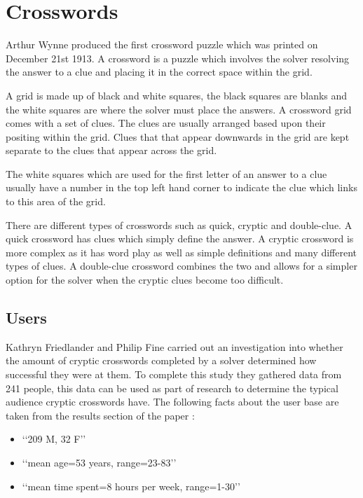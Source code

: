 \section{Crosswords}

Arthur Wynne produced the first crossword puzzle which was printed on December
21st 1913. A crossword is a puzzle which involves the solver resolving the
answer to a clue and placing it in the correct space within the grid. 

A grid is made up of black and white squares, the black squares are blanks and 
the white squares are where the solver must place the answers. A crossword grid 
comes with a set of clues. The clues are usually arranged based upon their 
positing within the grid. Clues that that appear downwards in the grid are kept 
separate to the clues that appear across the grid. 

The white squares which are used for the first letter of an answer to a clue 
usually have a number in the top left hand corner to indicate the clue which 
links to this area of the grid.

There are different types of crosswords such as quick, cryptic and double-clue.
A quick crossword has clues which simply define the answer. A cryptic crossword
is more complex as it has word play as well as simple definitions and many
different types of clues. A double-clue crossword combines the two and allows
for a simpler option for the solver when the cryptic clues become too difficult.

\newpage
\subsection{Users}
Kathryn Friedlander and Philip Fine \citep{friedlander09} carried out an investigation into whether the amount of cryptic crosswords completed by a solver determined how successful they were at them. To complete this study they gathered data from 241 people, this data can be used as part of research to determine the typical audience cryptic crosswords have. The following facts about the user base are taken from the results section of the paper \citep{friedlander09}:

\begin{itemize}
	\item \lq\lq 209 M, 32 F\rq\rq
	\item \lq\lq  mean age=53 years, range=23-83\rq\rq
	\item \lq\lq  mean time spent=8 hours per week, range=1-30\rq\rq
\end{itemize}

